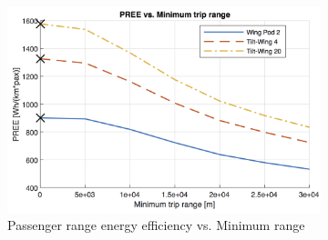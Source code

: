 \begin{figure}[h]
\begin{subfigure}[t]{0.33\textwidth}
    \includegraphics[width=\textwidth]{Figures/report_PREE.png}
    \captionsetup{justification=centering}
    \caption{Passenger range energy efficiency vs. Minimum range}
    \label{fig:sens03} 
\end{subfigure}
\captionsetup{justification=centering}
\caption{}
\label{fig:sens0123}
\end{figure}

